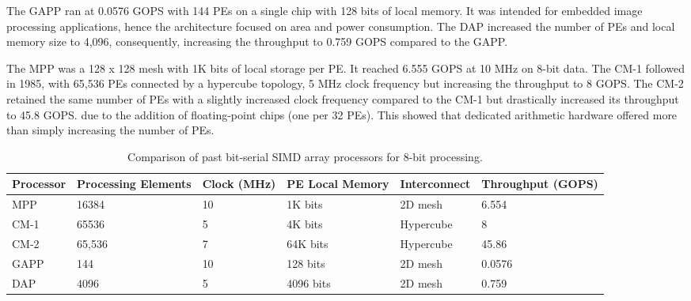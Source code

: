         The GAPP ran at 0.0576 GOPS with 144 PEs on a single chip with 128 bits of local memory. It was intended for embedded image processing applications, hence the architecture focused on area and power consumption. The DAP increased the number of PEs and local memory size to 4,096, consequently, increasing the throughput to 0.759 GOPS compared to the GAPP.

        The MPP was a 128 x 128 mesh with 1K bits of local storage per PE. It reached 6.555 GOPS at 10 MHz on 8-bit data. The CM-1 followed in 1985, with 65,536 PEs connected by a hypercube topology, 5 MHz clock frequency but increasing the throughput to 8 GOPS. The CM-2 retained the same number of PEs with a slightly increased clock frequency compared to the CM-1 but drastically increased its throughput to 45.8 GOPS. due to the addition of floating-point chips (one per 32 PEs). This showed that dedicated arithmetic hardware offered more than simply increasing the number of PEs. 
        
            \begin{table}[H]
            \centering
            \caption[Bit-serial array processors]{Comparison of past bit-serial SIMD array processors for 8-bit processing.}
            \label{table:bitserial_processors}
            
            \begin{tabularx}{\linewidth}{ZZZZZZ}
            \toprule
            \textbf{Processor} & \textbf{Processing Elements} & \textbf{Clock (MHz)} & \textbf{PE Local Memory} & \textbf{Interconnect} & \textbf{Throughput (GOPS)}\\
            \midrule
            
            MPP & 16384 & 10 & 1K bits & 2D mesh & 6.554\\
            CM-1 & 65536 & 5 & 4K bits & Hypercube & 8\\
            CM-2 & 65,536 & 7 & 64K bits & Hypercube & 45.86 \\
            GAPP & 144 & 10 & 128 bits & 2D mesh & 0.0576\\
            DAP & 4096 & 5 & 4096 bits & 2D mesh & 0.759\\   
            
            \bottomrule
            \end{tabularx}
            \end{table}
    
